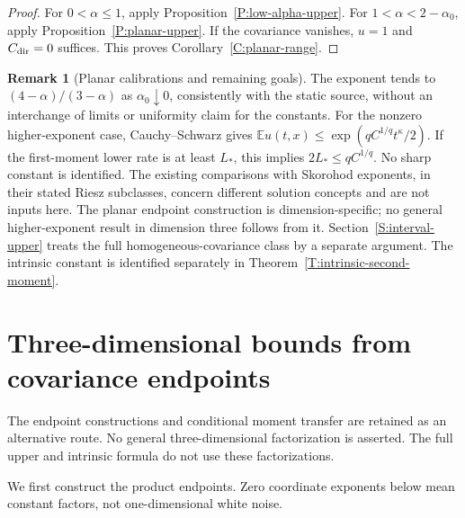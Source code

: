 \documentclass[12pt,oneside,openany]{book}
\numberwithin{equation}{section}
\theoremstyle{nogostyle}
\theoremstyle{definition}
\newtheorem{remark}[theorem]{Remark}
\newcommand{\E}{\mathbb{E}}
\begin{document}
\begin{proof}
  For $0 < \alpha \le 1$, apply Proposition~\ref{P:low-alpha-upper}. For $1 <
  \alpha < 2-\alpha_0$, apply Proposition~\ref{P:planar-upper}. If the
  covariance vanishes, $u = 1$ and $C_{\rm dir} = 0$ suffices. This proves
  Corollary~\ref{C:planar-range}.
\end{proof}

\begin{remark}[Planar calibrations and remaining goals]\label{R:planar-scope}
  The exponent tends to $(4-\alpha)/(3-\alpha)$ as $\alpha_0\downarrow0$,
  consistently with the static source, without an interchange of limits or
  uniformity claim for the constants. For the nonzero higher-exponent case,
  Cauchy--Schwarz gives $\E u(t,x) \le \exp(qC^{1/q}t^\kappa/2)$. If the
  first-moment lower rate is at least $L_*$, this implies $2L_* \le qC^{1/q}$.
  No sharp constant is identified. The existing comparisons with Skorohod
  exponents, in their stated Riesz subclasses, concern different solution
  concepts and are not inputs here. The planar endpoint construction is
  dimension-specific; no general higher-exponent result in dimension three
  follows from it. Section~\ref{S:interval-upper} treats the full
  homogeneous-covariance class by a separate argument. The intrinsic constant is
  identified separately in Theorem~\ref{T:intrinsic-second-moment}.
\end{remark}

\section{Three-dimensional bounds from covariance endpoints}
\label{S:three-endpoints}

The endpoint constructions and conditional moment transfer are retained as an
alternative route. No general three-dimensional factorization is asserted. The
full upper and intrinsic formula do not use these factorizations.

We first construct the product endpoints. Zero coordinate exponents below mean
constant factors, not one-dimensional white noise.
\end{document}
